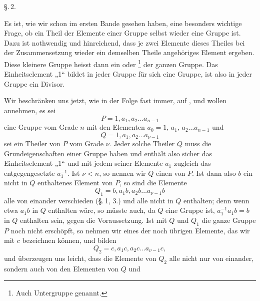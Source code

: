 
\begin{center}
\S.\,2.

\end{center}

Es ist, wie wir schon im ersten Bande gesehen haben, eine besonders wichtige Frage, ob ein Theil der Elemente einer Gruppe selbst wieder eine Gruppe ist. Dazu ist nothwendig und hinreichend, dass je zwei Elemente dieses Theiles bei der Zusammensetzung wieder ein demselben Theile angehöriges Element ergeben. Diese kleinere Gruppe heisst dann ein  oder \footnote{Auch Untergruppe genannt.} der ganzen Gruppe. Das Einheitselement „1“ bildet in jeder Gruppe für sich eine Gruppe, ist also in jeder Gruppe ein Divisor.

Wir beschränken uns jetzt, wie in der Folge fast immer, auf , und wollen annehmen, es sei
\[
P = 1, a_1, a_2 \ldots a_{n-1}
\]
eine Gruppe vom Grade $n$ mit den Elementen $a_0 = 1$, $a_1$, $a_2 \ldots a_{n-1}$ und
\[
Q = 1, a_1, a_2 \ldots a_{\nu-1}
\]
sei ein Theiler von $P$ vom Grade $\nu$. Jeder solche Theiler $Q$ muss die Grundeigenschaften einer Gruppe haben und enthält also sicher das Einheitselement „1“ und mit jedem seiner Elemente $a_1$ zugleich das entgegengesetzte $a_1^{-1}$. Ist $\nu < n$, so nennen wir $Q$ einen  von $P$. Ist dann also $b$ ein nicht in $Q$ enthaltenes Element von $P$, so sind die Elemente
\[
Q_1 = b, a_1 b, a_2 b \ldots a_{\nu-1} b
\]
alle von einander verschieden (\S.\,1, 3.) und alle nicht in $Q$ enthalten; denn wenn etwa $a_1 b$ in $Q$ enthalten wäre, so müsste auch, da $Q$ eine Gruppe ist, $a_1^{-1} a_1 b = b$ in $Q$ enthalten sein, gegen die Voraussetzung. Ist mit $Q$ und $Q_1$ die ganze Gruppe $P$ noch nicht erschöpft, so nehmen wir eines der noch übrigen Elemente, das wir mit $c$ bezeichnen können, und bilden
\[
Q_2 = c, a_1 c, a_2 c \ldots a_{\nu-1} c,
\]
und überzeugen uns leicht, dass die Elemente von $Q_2$ alle nicht nur von einander, sondern auch von den Elementen von $Q$ und
